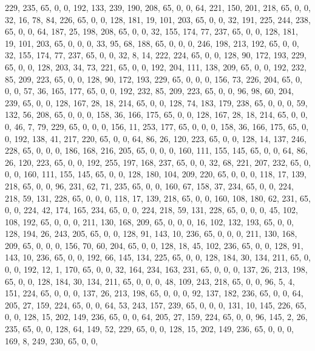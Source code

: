 \begin{DoxyCode}
       229, 235, 65, 0, 0, 192, 133, 239, 190, 208, 65, 0, 0, 64, 221, 150, 201, 218, 65, 0, 0, 32, 16, 78, 84,
       226, 65, 0, 0, 128, 181, 19, 101, 203, 65, 0, 0, 32, 191, 225, 244, 238, 65, 0, 0, 64, 187, 25, 198, 208, 65,
       0, 0, 32, 155, 174, 77, 237, 65, 0, 0, 128, 181, 19, 101, 203, 65, 0, 0, 0, 33, 95, 68, 188, 65, 0, 0, 0,
       246, 198, 213, 192, 65, 0, 0, 32, 155, 174, 77, 237, 65, 0, 0, 32, 8, 14, 222, 224, 65, 0, 0, 128, 90, 172,
       193, 229, 65, 0, 0, 128, 203, 34, 73, 221, 65, 0, 0, 192, 204, 111, 138, 209, 65, 0, 0, 192, 232, 85, 209, 223,
       65, 0, 0, 128, 90, 172, 193, 229, 65, 0, 0, 0, 156, 73, 226, 204, 65, 0, 0, 0, 57, 36, 165, 177, 65, 0, 0,
       192, 232, 85, 209, 223, 65, 0, 0, 96, 98, 60, 204, 239, 65, 0, 0, 128, 167, 28, 18, 214, 65, 0, 0, 128, 74,
       183, 179, 238, 65, 0, 0, 0, 59, 132, 56, 208, 65, 0, 0, 0, 158, 36, 166, 175, 65, 0, 0, 128, 167, 28, 18,
       214, 65, 0, 0, 0, 46, 7, 79, 229, 65, 0, 0, 0, 156, 11, 253, 177, 65, 0, 0, 0, 158, 36, 166, 175, 65, 0, 0,
       192, 138, 41, 217, 220, 65, 0, 0, 64, 86, 26, 120, 223, 65, 0, 0, 128, 14, 137, 246, 228, 65, 0, 0, 0, 186,
       168, 216, 205, 65, 0, 0, 0, 160, 111, 155, 145, 65, 0, 0, 64, 86, 26, 120, 223, 65, 0, 0, 192, 255, 197, 168,
       237, 65, 0, 0, 32, 68, 221, 207, 232, 65, 0, 0, 0, 160, 111, 155, 145, 65, 0, 0, 128, 180, 104, 209, 220,
       65, 0, 0, 0, 118, 17, 139, 218, 65, 0, 0, 96, 231, 62, 71, 235, 65, 0, 0, 160, 67, 158, 37, 234, 65, 0, 0,
       224, 218, 59, 131, 228, 65, 0, 0, 0, 118, 17, 139, 218, 65, 0, 0, 160, 108, 180, 62, 231, 65, 0, 0, 224, 42,
       174, 165, 234, 65, 0, 0, 224, 218, 59, 131, 228, 65, 0, 0, 0, 45, 102, 108, 192, 65, 0, 0, 0, 211, 130, 168,
       209, 65, 0, 0, 0, 16, 102, 132, 193, 65, 0, 0, 128, 194, 26, 243, 205, 65, 0, 0, 128, 91, 143, 10, 236, 65,
       0, 0, 0, 211, 130, 168, 209, 65, 0, 0, 0, 156, 70, 60, 204, 65, 0, 0, 128, 18, 45, 102, 236, 65, 0, 0, 128,
       91, 143, 10, 236, 65, 0, 0, 192, 66, 145, 134, 225, 65, 0, 0, 128, 184, 30, 134, 211, 65, 0, 0, 0, 192, 12,
       1, 170, 65, 0, 0, 32, 164, 234, 163, 231, 65, 0, 0, 0, 137, 26, 213, 198, 65, 0, 0, 128, 184, 30, 134, 211,
       65, 0, 0, 0, 48, 109, 243, 218, 65, 0, 0, 96, 5, 4, 151, 224, 65, 0, 0, 0, 137, 26, 213, 198, 65, 0, 0, 0,
       92, 137, 182, 236, 65, 0, 0, 64, 205, 27, 159, 224, 65, 0, 0, 64, 53, 243, 157, 239, 65, 0, 0, 0, 131, 10,
       145, 226, 65, 0, 0, 128, 15, 202, 149, 236, 65, 0, 0, 64, 205, 27, 159, 224, 65, 0, 0, 96, 145, 2, 26, 235, 65,
       0, 0, 128, 64, 149, 52, 229, 65, 0, 0, 128, 15, 202, 149, 236, 65, 0, 0, 0, 169, 8, 249, 230, 65, 0, 0,

\end{DoxyCode}
